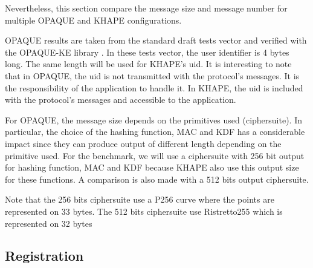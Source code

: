 \documentclass[../report.tex]{subfiles}
\begin{document}
Nevertheless, this section compare the message size and message number for multiple OPAQUE and KHAPE configurations.



OPAQUE results are taken from the standard draft tests vector and verified with the OPAQUE-KE library \cite{OPAQUE-KE}. In these tests vector, the user identifier is 4 bytes long. The same length will be used for KHAPE's uid. It is interesting to note that in OPAQUE, the uid is not transmitted with the protocol's messages. It is the responsibility of the application to handle it. In KHAPE, the uid is included with the protocol's messages and accessible to the application.

For OPAQUE, the message size depends on the primitives used (ciphersuite). In particular, the choice of the hashing function, MAC and KDF has a considerable impact since they can produce output of different length depending on the primitive used.
For the benchmark, we will use a ciphersuite with 256 bit output for hashing function, MAC and KDF because KHAPE also use this output size for these functions. A comparison is also made with a 512 bits output ciphersuite.


Note that the 256 bits ciphersuite use a P256 curve where the points are represented on 33 bytes. The 512 bits ciphersuite use Ristretto255 which is represented on 32 bytes



% 
% 



\pgfplotsset{width=\textwidth-2.4cm}


\subsection*{Registration}
\end{document}
